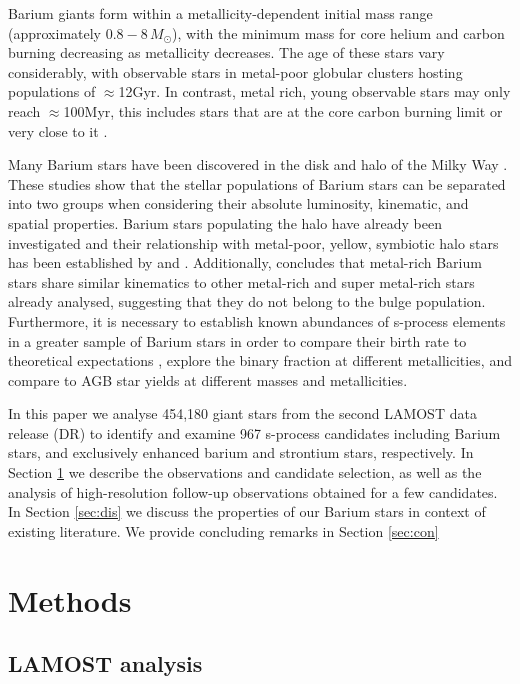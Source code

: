 \documentclass[a4paper,fleqn,usenatbib]{mnras}
\begin{document}
Barium giants form within a metallicity-dependent initial mass range (approximately $0.8 - 8\,M_{\odot}$), with the minimum mass for core helium and carbon burning decreasing as metallicity decreases. The age of these stars vary considerably, with observable stars in metal-poor globular clusters hosting populations of $\approx$12Gyr. In contrast, metal rich, young observable stars may only reach $\approx$100Myr, this includes stars that are at the core carbon burning limit or very close to it \citep[e.g.][]{whitelock2013}.

Many Barium stars have been discovered in the disk and halo of the Milky Way \citep{gomez1997,mennessier1997}. These studies show that the stellar populations of Barium stars can be separated into two groups when considering their absolute luminosity, kinematic, and spatial properties. Barium stars populating the halo have already been investigated \citep[e.g.][]{junqueira2001,drake2008,pereira2009,allen2006} and their relationship with metal-poor, yellow, symbiotic halo stars has been established by \citet{jorissen2005} and \citet{pereira2009}. Additionally, \citet{pereira2011} concludes that metal-rich Barium stars share similar kinematics to other metal-rich and super metal-rich stars already analysed, suggesting that they do not belong to the bulge population. Furthermore, it is necessary to establish known abundances of s-process elements in a greater sample of Barium stars in order to compare their birth rate to theoretical expectations \citep{han1995}, explore the binary fraction at different metallicities, and compare to AGB star yields at different masses and metallicities.

In this paper we analyse 454,180 giant stars from the second LAMOST data release (DR) to identify and examine 967 s-process candidates including Barium stars, and exclusively enhanced barium and strontium stars, respectively. In Section \ref{sec:methods} we describe the observations and candidate selection, as well as the analysis of high-resolution follow-up observations obtained for a few candidates. In Section \ref{sec:dis} we discuss the properties of our Barium stars in context of existing literature. We provide concluding remarks in Section \ref{sec:con}

\section{Methods} \label{sec:methods}
\subsection{LAMOST analysis}
\end{document}
